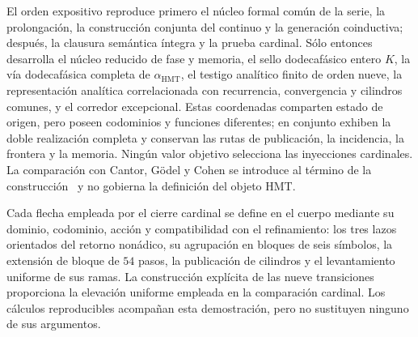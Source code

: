 El orden expositivo reproduce primero el núcleo formal común de la serie, la
prolongación, la construcción conjunta del continuo y la generación
coinductiva; después, la clausura semántica íntegra y la prueba cardinal. Sólo
entonces desarrolla el núcleo reducido de fase y memoria, el sello
dodecafásico entero \(K\), la vía dodecafásica completa de
\(\alpha_{\mathrm{HMT}}\), el testigo analítico finito de orden nueve, la
representación analítica correlacionada con recurrencia, convergencia y
cilindros comunes, y el corredor excepcional. Estas coordenadas comparten
estado de origen, pero poseen codominios y funciones diferentes; en conjunto
exhiben la doble realización completa y conservan las rutas de publicación, la
incidencia, la frontera y la memoria. Ningún valor objetivo selecciona las
inyecciones cardinales. La comparación con Cantor, Gödel y Cohen se introduce
al término de la construcción~\cite{Cantor1878,Hilbert1902,Godel1938,Cohen1963,Cohen1964}
y no gobierna la definición del objeto HMT.

Cada flecha empleada por el cierre cardinal se define en el cuerpo mediante su
dominio, codominio, acción y compatibilidad con el refinamiento: los tres lazos
orientados del retorno nonádico, su agrupación en bloques de seis símbolos, la
extensión de bloque de \(54\) pasos, la publicación de cilindros y el
levantamiento uniforme de sus ramas. La construcción explícita de las nueve
transiciones proporciona la elevación uniforme empleada en la comparación
cardinal. Los cálculos reproducibles acompañan esta demostración, pero no
sustituyen ninguno de sus argumentos.
